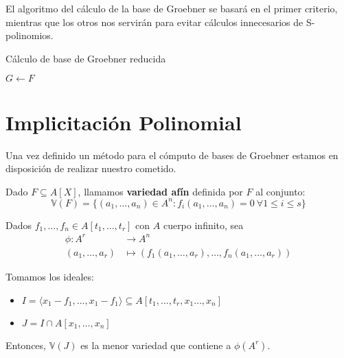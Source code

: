 El algoritmo del cálculo de la base de Groebner se basará en el primer criterio, mientras que los otros nos servirán para evitar cálculos innecesarios de S-polinomios.

\begin{algorithm}[hbt!]
  \caption{Cálculo de base de Groebner reducida}\label{alg:two}

  $G\gets F$\;


\end{algorithm}

\section{Implicitación Polinomial}
Una vez definido un método para el cómputo de bases de Groebner estamos en disposición de realizar nuestro cometido.


\begin{definicion}Dado $F \subseteq A[X]$, llamamos \textbf{variedad afín} definida por $F$ al conjunto:
  \begin{equation*}
    \mathbb{V}(F) = \{(a_1,\dots, a_n)\in A^n : f_i(a_1,\dots, a_n)=0 \ \forall 1\le i \le s\}
  \end{equation*}
\end{definicion}

\begin{teorema}
  Dados $f_1,\dots, f_n \in A[t_1, \dots, t_r]$ con $A$ cuerpo infinito, sea
  \begin{equation*}
    \begin{align*}
      \phi \colon A^r  & \to A^n                                                              \\
      (a_1,\dots, a_r) & \mapsto \left(f_1(a_1,\dots, a_r), \dots, f_n(a_1,\dots, a_r)\right)
    \end{align*}
  \end{equation*}

  Tomamos los ideales:
  \begin{itemize}
    \item $I = \langle x_1-f_1,\dots,  x_1-f_1\rangle \subseteq A[t_1,\dots, t_r,x_1\dots, x_n]$
    \item $J = I\cap A[x_1,\dots, x_n]$
  \end{itemize}

  Entonces, $\mathbb{V}(J)$ es la menor variedad que contiene a $\phi(A^r)$.
\end{teorema}
